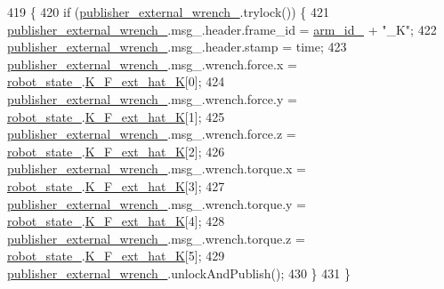 \begin{DoxyCode}
419                                                                      \{
420   \textcolor{keywordflow}{if} (\hyperlink{classfranka__control_1_1FrankaStateController_aeff7a641817b5261934421fcbd1205f5}{publisher\_external\_wrench\_}.trylock()) \{
421     \hyperlink{classfranka__control_1_1FrankaStateController_aeff7a641817b5261934421fcbd1205f5}{publisher\_external\_wrench\_}.msg\_.header.frame\_id = 
      \hyperlink{classfranka__control_1_1FrankaStateController_a603d865facc13c7b1f2ebb5a27404221}{arm\_id\_} + \textcolor{stringliteral}{"\_K"};
422     \hyperlink{classfranka__control_1_1FrankaStateController_aeff7a641817b5261934421fcbd1205f5}{publisher\_external\_wrench\_}.msg\_.header.stamp = time;
423     \hyperlink{classfranka__control_1_1FrankaStateController_aeff7a641817b5261934421fcbd1205f5}{publisher\_external\_wrench\_}.msg\_.wrench.force.x = 
      \hyperlink{classfranka__control_1_1FrankaStateController_a0d097abb2665aadbc8d38662bba5ae8b}{robot\_state\_}.\hyperlink{structfranka_1_1RobotState_a96267d443c05fcc58d7ac32f63912649}{K\_F\_ext\_hat\_K}[0];
424     \hyperlink{classfranka__control_1_1FrankaStateController_aeff7a641817b5261934421fcbd1205f5}{publisher\_external\_wrench\_}.msg\_.wrench.force.y = 
      \hyperlink{classfranka__control_1_1FrankaStateController_a0d097abb2665aadbc8d38662bba5ae8b}{robot\_state\_}.\hyperlink{structfranka_1_1RobotState_a96267d443c05fcc58d7ac32f63912649}{K\_F\_ext\_hat\_K}[1];
425     \hyperlink{classfranka__control_1_1FrankaStateController_aeff7a641817b5261934421fcbd1205f5}{publisher\_external\_wrench\_}.msg\_.wrench.force.z = 
      \hyperlink{classfranka__control_1_1FrankaStateController_a0d097abb2665aadbc8d38662bba5ae8b}{robot\_state\_}.\hyperlink{structfranka_1_1RobotState_a96267d443c05fcc58d7ac32f63912649}{K\_F\_ext\_hat\_K}[2];
426     \hyperlink{classfranka__control_1_1FrankaStateController_aeff7a641817b5261934421fcbd1205f5}{publisher\_external\_wrench\_}.msg\_.wrench.torque.x = 
      \hyperlink{classfranka__control_1_1FrankaStateController_a0d097abb2665aadbc8d38662bba5ae8b}{robot\_state\_}.\hyperlink{structfranka_1_1RobotState_a96267d443c05fcc58d7ac32f63912649}{K\_F\_ext\_hat\_K}[3];
427     \hyperlink{classfranka__control_1_1FrankaStateController_aeff7a641817b5261934421fcbd1205f5}{publisher\_external\_wrench\_}.msg\_.wrench.torque.y = 
      \hyperlink{classfranka__control_1_1FrankaStateController_a0d097abb2665aadbc8d38662bba5ae8b}{robot\_state\_}.\hyperlink{structfranka_1_1RobotState_a96267d443c05fcc58d7ac32f63912649}{K\_F\_ext\_hat\_K}[4];
428     \hyperlink{classfranka__control_1_1FrankaStateController_aeff7a641817b5261934421fcbd1205f5}{publisher\_external\_wrench\_}.msg\_.wrench.torque.z = 
      \hyperlink{classfranka__control_1_1FrankaStateController_a0d097abb2665aadbc8d38662bba5ae8b}{robot\_state\_}.\hyperlink{structfranka_1_1RobotState_a96267d443c05fcc58d7ac32f63912649}{K\_F\_ext\_hat\_K}[5];
429     \hyperlink{classfranka__control_1_1FrankaStateController_aeff7a641817b5261934421fcbd1205f5}{publisher\_external\_wrench\_}.unlockAndPublish();
430   \}
431 \}
\end{DoxyCode}
